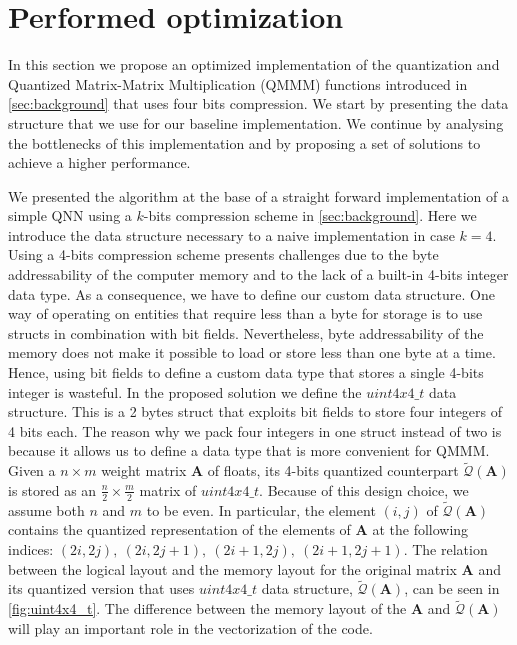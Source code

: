 \section{Performed optimization}\label{sec:yourmethod}
In this section we propose an optimized implementation of the quantization and Quantized Matrix-Matrix Multiplication (QMMM) functions introduced in \cref{sec:background} that uses four bits compression. We start by presenting the data structure that we use for our baseline implementation. We continue by analysing the bottlenecks of this implementation and by proposing a set of solutions to achieve a higher performance.

We presented the algorithm at the base of a straight forward implementation of a simple QNN using a $k$-bits compression scheme in \cref{sec:background}. Here we introduce the data structure necessary to a naive implementation in case $k=4$. Using a 4-bits compression scheme presents challenges due to the byte addressability of the computer memory and to the lack of a built-in 4-bits integer data type. As a consequence, we have to define our custom data structure. One way of operating on entities that require less than a byte for storage is to use structs in combination with bit fields. Nevertheless, byte addressability of the memory does not make it possible to load or store less than one byte at a time. Hence, using bit fields to define a custom data type that stores a single 4-bits integer is wasteful.  In the proposed solution we define the $uint4x4\_t$ data structure. This is a 2 bytes struct that exploits bit fields to store four integers of 4 bits each. The reason why we pack four integers in one struct instead of two is because it allows us to define a data type that is more convenient for QMMM. Given a $n\times m$ weight matrix $\mathbf{A}$ of floats, its 4-bits quantized counterpart $\tilde{\mathcal{Q}}(\mathbf{A})$ is stored as an $\frac{n}{2}\times \frac{m}{2}$ matrix of $uint4x4\_t$. Because of this design choice, we assume both $n$ and $m$ to be even. In particular, the element $(i, j)$ of $\tilde{\mathcal{Q}}(\mathbf{A})$ contains the quantized representation of the elements of $\mathbf{A}$ at the following indices: $(2i, 2j),~(2i, 2j+1),~(2i+1, 2j),~(2i+1, 2j+1)$. The relation between the logical layout and the memory layout for the original matrix $\mathbf{A}$ and its quantized version that uses $uint4x4\_t$ data structure,   $\tilde{\mathcal{Q}}(\mathbf{A})$, can be seen in \cref{fig:uint4x4_t}. The difference between the memory layout of the $\mathbf{A}$ and $\tilde{\mathcal{Q}}(\mathbf{A})$ will play an important role in the vectorization of the code.


